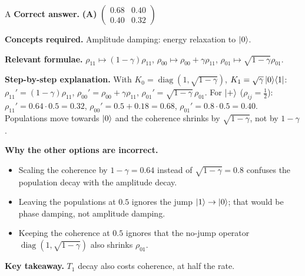 \documentclass[11pt,a4paper]{article}
\newcommand{\qsep}{\par\vspace{2pt}{\color{black!15}\hrule}\vspace{4pt}}
\begin{document}
\begin{solbox}{A}
\textbf{\color{brand}Correct answer.} \textcolor{okgreen}{\textbf{(A)}} $\begin{pmatrix}0.68 & 0.40\\ 0.40 & 0.32\end{pmatrix}$

\textbf{\color{brand}Concepts required.} Amplitude damping: energy relaxation to $\ket0$.

\textbf{\color{brand}Relevant formulae.} $\rho_{11} \mapsto (1-\gamma)\rho_{11}$, $\rho_{00} \mapsto \rho_{00} + \gamma\rho_{11}$, $\rho_{01} \mapsto \sqrt{1-\gamma}\rho_{01}$.

\textbf{\color{brand}Step-by-step explanation.} With $K_0 = \operatorname{diag}(1, \sqrt{1-\gamma})$, $K_1 = \sqrt\gamma\ket0\!\bra1$:
$\rho_{11}' = (1 - \gamma)\rho_{11}$, $\rho_{00}' = \rho_{00} + \gamma\rho_{11}$, $\rho_{01}' = \sqrt{1 - \gamma}\,\rho_{01}$.
For $\ket+$ ($\rho_{ij} = \frac12$): $\rho_{11}' = 0.64\cdot0.5 = 0.32$, $\rho_{00}' = 0.5 + 0.18 = 0.68$, $\rho_{01}' = 0.8\cdot0.5 = 0.40$.
Populations move towards $\ket0$ and the coherence shrinks by $\sqrt{1 - \gamma}$, not by $1 - \gamma$.

\textbf{\color{brand}Why the other options are incorrect.}
\begin{itemize}[leftmargin=2.4em, itemsep=1pt, topsep=2pt]
\item[\textbf{(B)}] Scaling the coherence by $1 - \gamma = 0.64$ instead of $\sqrt{1-\gamma} = 0.8$ confuses the population decay with the amplitude decay.
\item[\textbf{(C)}] Leaving the populations at $0.5$ ignores the jump $\ket1 \to \ket0$; that would be phase damping, not amplitude damping.
\item[\textbf{(D)}] Keeping the coherence at $0.5$ ignores that the no-jump operator $\operatorname{diag}(1, \sqrt{1-\gamma})$ also shrinks $\rho_{01}$.
\end{itemize}
\textbf{\color{brand}Key takeaway.} $T_1$ decay also costs coherence, at half the rate.
\end{solbox}
\qsep
\end{document}
